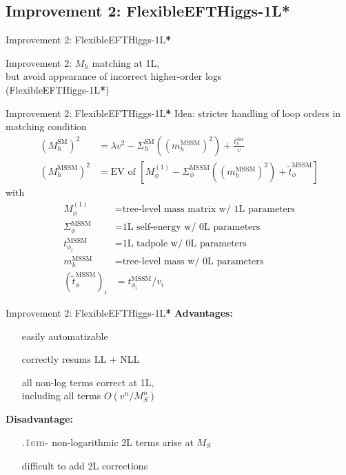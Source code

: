 \documentclass[hyperref={pdfpagelabels=false},ngerman]{beamer}
\newcommand{\cmark}{\ding{51}}%
\newcommand{\xmark}{\ding{55}}%
\newcommand{\ok}{\textcolor{darkgreen}{\cmark}}
\newcommand{\notok}{\textcolor{red}{\xmark}}
\newcommand{\meh}{\textcolor{gray}{\textbf{\huge\lower.1em\hbox{-}}}}
\renewcommand{\emph}{\textbf}
\newcommand{\SM}{\ensuremath{\text{SM}}}
\newcommand{\MSSM}{\ensuremath{\text{MSSM}}}
\newcommand{\fsstar}{\textbf{*}}
\begin{document}

\subsection{Improvement 2: FlexibleEFTHiggs-1L\protect\fsstar}

\begin{frame}{Improvement 2: FlexibleEFTHiggs-1L\fsstar}
  \begin{center}
    \Large Improvement 2: $M_h$ matching at 1L, \\
    but avoid appearance of incorrect higher-order logs \\
    (FlexibleEFTHiggs-1L\fsstar)
  \end{center}
\end{frame}

\begin{frame}{Improvement 2: FlexibleEFTHiggs-1L\fsstar}
  Idea: stricter handling of loop orders in matching condition
  \begin{align*}
    (M_h^\SM)^2 &= \lambda v^2 - \Sigma^{\SM}_h((m_h^\MSSM)^2) + \frac{t_h^\SM}{v}\\
    (M_h^\MSSM)^2 &= \text{EV of } \left[M_\phi^{(1)} - \Sigma^{\MSSM}_\phi((m_h^\MSSM)^2) + \tilde{t}_\phi^\MSSM\right]
  \end{align*}
  with
  \begin{align*}
    M_\phi^{(1)} &= \text{tree-level mass matrix w/ 1L parameters} \\
    \Sigma^{\MSSM}_\phi &= \text{1L self-energy w/ 0L parameters} \\
    t^{\MSSM}_{\phi_i} &= \text{1L tadpole w/ 0L parameters} \\
    m_h^\MSSM &= \text{tree-level mass w/ 0L parameters} \\
    (\tilde{t}^{\MSSM}_\phi)_i &= t^{\MSSM}_{\phi_i} / v_i
  \end{align*}
\end{frame}

\begin{frame}{Improvement 2: FlexibleEFTHiggs-1L\fsstar}
  \emph{Advantages:}
  \begin{itemize}
  \item[\ok] easily automatizable
  \item[\ok] correctly resums LL + NLL
  \item[\ok] all non-log terms correct at 1L, \\
    including all terms $O(v^n/M_S^n)$
  \end{itemize}
  \emph{Disadvantage:}
  \begin{itemize}
  \item[\meh] non-logarithmic 2L terms arise at $M_S$
  \item[\notok] difficult to add 2L corrections
  \end{itemize}
\end{frame}
\end{document}
